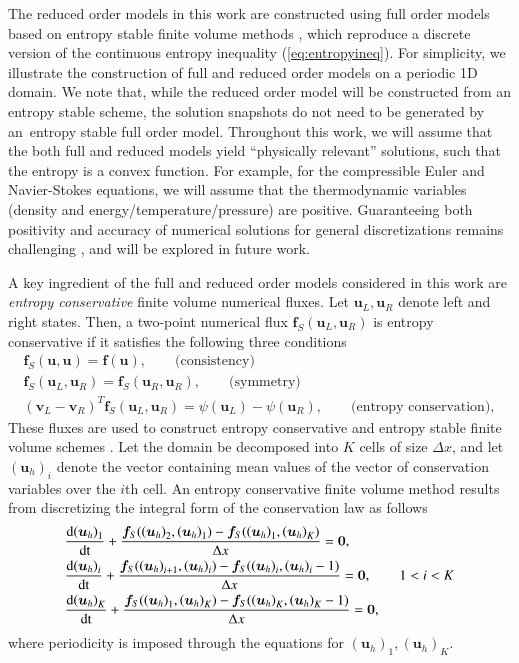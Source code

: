 \documentclass[preprint,10pt]{elsarticle}
\theoremstyle{definition}
\theoremstyle{lemma}
\theoremstyle{theorem}
\theoremstyle{assumption}
\newcommand{\td}[2]{\frac{{\rm d}#1}{{\rm d}{\rm #2}}}
\newcommand{\LRp}[1]{\left( #1 \right)}
\begin{document}
The reduced order models in this work are constructed using full order models based on entropy stable finite volume methods \cite{tadmor1987numerical}, which reproduce a discrete version of the continuous entropy inequality (\ref{eq:entropyineq}).  For simplicity, we illustrate the construction of full and reduced order models on a periodic 1D domain.  We note that, while the reduced order model will be constructed from an entropy stable scheme, the solution snapshots do not need to be generated by an entropy stable full order model.  Throughout this work, we will assume that the both full and reduced models yield ``physically relevant'' solutions, such that the entropy is a convex function.  For example, for the compressible Euler and Navier-Stokes equations, we will assume that the thermodynamic variables (density and energy/temperature/pressure) are positive.  Guaranteeing both positivity and accuracy of numerical solutions for general discretizations remains challenging \cite{guermond2016invariant, guermond2019invariant}, and will be explored in future work.

A key ingredient of the full and reduced order models considered in this work are \textit{entropy conservative} finite volume numerical fluxes.  Let $\bm{u}_L, \bm{u}_R$ denote left and right states.  Then, a two-point numerical flux $\bm{f}_S(\bm{u}_L, \bm{u}_R)$ is entropy conservative if it satisfies the following three conditions
\begin{gather}
\bm{f}_S(\bm{u},\bm{u}) = \bm{f}(\bm{u}), \qquad \text{(consistency)} \label{eq:esflux}\\
\bm{f}_S(\bm{u}_L,\bm{u}_R) = \bm{f}_S(\bm{u}_R,\bm{u}_R), \qquad \text{(symmetry)} \nonumber\\
\LRp{\bm{v}_L-\bm{v}_R}^T\bm{f}_S(\bm{u}_L,\bm{u}_R) = \psi(\bm{u}_L) - \psi(\bm{u}_R), \qquad \text{(entropy conservation)}\nonumber,
\end{gather}
These fluxes are used to construct entropy conservative and entropy stable finite volume schemes \cite{tadmor1987numerical, chandrashekar2013kinetic, ray2016entropy}.  Let the domain be decomposed into $K$ cells of size $\Delta x$, and let ${\LRp{\bm{u}_h}_i}$ denote the vector containing mean values of the vector of conservation variables over the $i$th cell.  An entropy conservative finite volume method results from discretizing the integral form of the conservation law as follows
\begin{align}
&\td{{\LRp{\bm{u}_h}_1}}{t} + \frac{\bm{f}_S({\LRp{\bm{u}_h}_2},\LRp{\bm{u}_h}_1)-\bm{f}_S({\LRp{\bm{u}_h}_1},{\LRp{\bm{u}_h}_K})}{\Delta x} = \bm{0}, \label{eq:nonlineqs1d}\\
&\td{{\LRp{\bm{u}_h}_i}}{t} + \frac{\bm{f}_S({\LRp{\bm{u}_h}_{i+1}},\LRp{\bm{u}_h}_i)-\bm{f}_S({\LRp{\bm{u}_h}_i},{\LRp{\bm{u}_h}_i-1})}{\Delta x} = \bm{0}, \qquad 1 < i < K \nonumber\\
&\td{{\LRp{\bm{u}_h}_K}}{t} + \frac{\bm{f}_S({\LRp{\bm{u}_h}_1},\LRp{\bm{u}_h}_K)-\bm{f}_S({\LRp{\bm{u}_h}_K},{\LRp{\bm{u}_h}_K-1})}{\Delta x} = \bm{0},\nonumber
\end{align}
where periodicity is imposed through the equations for ${\LRp{\bm{u}_h}_1}, {\LRp{\bm{u}_h}_K}$.  
\end{document}
